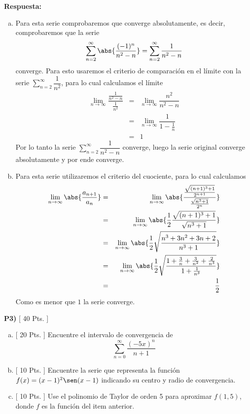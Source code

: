 \documentclass{article}
\begin{document}
\vspace{5mm}
\noindent\textbf{Respuesta:}
\begin{enumerate}[a)]
  \item Para esta serie comprobaremos que converge absolutamente, es decir, comprobaremos que la serie
    $$\sum_{n=2}^{\infty}\abs{\dfrac{(-1)^n}{n^2-n}}=\sum_{n=2}^{\infty}\dfrac{1}{n^2-n}$$
    converge. Para esto usaremos el criterio de comparación en el límite con la serie $\displaystyle\sum_{n=2}^{\infty}\dfrac{1}{n^2}$, para lo cual calculamos el límite
      \begin{eqnarray*}
        \lim_{n\to\infty}\dfrac{\frac{1}{n^2-n}}{\frac{1}{n^2}} 
          &=& \lim_{n\to\infty}\dfrac{n^2}{n^2-n}\\
          &=& \lim_{n\to\infty}\dfrac{1}{1-\frac{1}{n}}\\
          &=& 1
      \end{eqnarray*}
    Por lo tanto la serie $\displaystyle\sum_{n=2}^{\infty}\dfrac{1}{n^2-n}$ converge, luego la serie original converge absolutamente y por ende converge.
  \item Para esta serie utilizaremos el criterio del cuociente, para lo cual calculamos
    \begin{eqnarray*}
      \lim_{n\to\infty}\abs{\dfrac{a_{n+1}}{a_n}}
        &=& \lim_{n\to\infty}\abs{\dfrac{\frac{\sqrt{(n+1)^3+1}}{2^{n+1}}}{\frac{\sqrt{n^3+1}}{2^n}}}\\
        &=& \lim_{n\to\infty}\abs{\dfrac{1}{2}\dfrac{\sqrt{(n+1)^3+1}}{\sqrt{n^3+1}}}\\
        &=& \lim_{n\to\infty}\abs{\dfrac{1}{2}\sqrt{\dfrac{n^3+3n^2+3n+2}{n^3+1}}}\\
        &=& \lim_{n\to\infty}\abs{\dfrac{1}{2}\sqrt{\dfrac{1+\frac{3}{n}+\frac{3}{n^2}+\frac{2}{n^3}}{1+\frac{1}{n^3}}}}\\
        &=& \dfrac{1}{2}
    \end{eqnarray*}
    Como es menor que $1$ la serie converge.
\end{enumerate}


\newpage
\noindent\textbf{P3) }\textsf{[ 40 Pts. ] }
\begin{enumerate}[a)]
  \item \textsf{[ 20 Pts. ] }Encuentre el intervalo de convergencia de
    $$\sum_{n=0}^{\infty}\dfrac{(-5x)^n}{n+1}$$
  \item \textsf{[ 10 Pts. ] }Encuentre la serie que representa la función $f(x)=(x-1)^2\sen(x-1)$ indicando su centro y radio de convergencia.
  \item \textsf{[ 10 Pts. ] }Use el polinomio de Taylor de orden 5 para aproximar $f(1,5)$, donde $f$ es la función del item anterior.
\end{enumerate}
\end{document}
